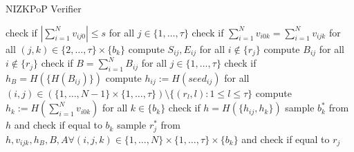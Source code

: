 \documentclass[11pt,a4paper]{article}
\begin{document}
\begin{algorithm}[H]
\centering
\caption{NIZKPoP Verifier}\label{verify}
\begin{algorithmic}[1]
	\State check if $|\sum_{i=1}^{N}v_{ij0}|\leq s$ for all $j\in\{1,\ldots,\tau\}$
	\State check if $\sum_{i=1}^{N}v_{i0k} = \sum_{i=1}^{N}v_{ijk}$ for all $(j,k)\in\{2,\ldots,\tau\}\times\{b_k\}$
	\State compute $S_{ij},E_{ij}$ for all $i\not\in\{r_j\}$
	\State compute $B_{ij}$ for all $i\not\in\{r_j\}$
	\State check if $B=\sum_{i=1}^{N}B_{ij}$ for all $j\in\{1,\ldots,\tau\}$
	\State check if $h_B=H(\{H(B_{ij})\})$
	\State compute $h_{ij}:=H(seed_{ij})$ for all $(i,j)\in(\{1,\ldots,N-1\}\times\{1,\ldots,\tau\})\setminus\{(r_l,l):1\leq l\leq\tau\}$
	\State compute $h_k:=H(\sum_{i=1}^{N}v_{i0k})$ for all $k\in\{b_k\}$
	\State check if $h=H(\{h_{ij},h_k\})$
	\State sample $b_k^*$ from $h$ and check if equal to $b_k$
	\State sample $r_j^*$ from $h,v_{ijk},h_B,B,A\forall(i,j,k)\in\{1,\ldots,N\}\times\{1,\ldots,\tau\}\times\{b_k\}$ and check if equal to $r_j$
\end{algorithmic}
\end{algorithm}
\end{document}
